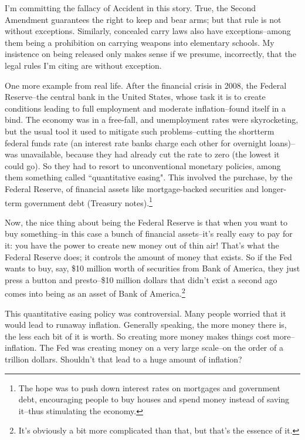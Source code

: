 I'm committing the fallacy of Accident in this story. True, the Second Amendment guarantees the
right to keep and bear arms; but that rule is not without exceptions. Similarly, concealed carry laws
also have exceptions--among them being a prohibition on carrying weapons into elementary
schools. My insistence on being released only makes sense if we presume, incorrectly, that the
legal rules I'm citing are without exception.

One more example from real life. After the financial crisis in 2008, the Federal Reserve--the
central bank in the United States, whose task it is to create conditions leading to full employment
and moderate inflation--found itself in a bind. The economy was in a free-fall, and unemployment
rates were skyrocketing, but the usual tool it used to mitigate such problems--cutting the shortterm federal funds rate (an interest rate banks charge each other for overnight loans)--was
unavailable, because they had already cut the rate to zero (the lowest it could go). So they had to
resort to unconventional monetary policies, among them something called ``quantitative easing".
This involved the purchase, by the Federal Reserve, of financial assets like mortgage-backed
securities and longer-term government debt 
(Treasury notes).\footnote{The hope was to push down interest rates on mortgages and government debt, encouraging people to buy houses
and spend money instead of saving it--thus stimulating the economy.}

Now, the nice thing about being the Federal Reserve is that when you want to buy something--in
this case a bunch of financial assets--it's really easy to pay for it: you have the power to create
new money out of thin air! That's what the Federal Reserve does; it controls the amount of money
that exists. So if the Fed wants to buy, say, \$10 million worth of securities from Bank of America,
they just press a button and presto--\$10 million dollars that didn't exist a second ago comes into
being as an asset of Bank of 
America.\footnote{It's obviously a bit more complicated than that, but that's the essence of it.}

This quantitative easing policy was controversial. Many people worried that it would lead to
runaway inflation. Generally speaking, the more money there is, the less each bit of it is worth. So
creating more money makes things cost more--inflation. The Fed was creating money on a very
large scale--on the order of a trillion dollars. Shouldn't that lead to a huge amount of inflation?

